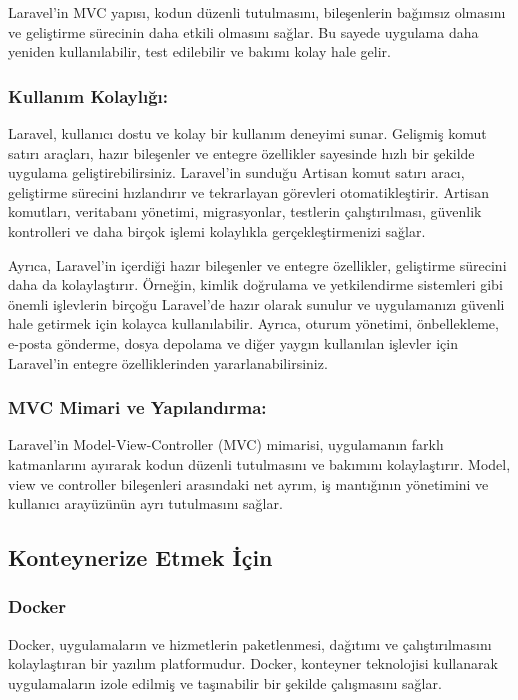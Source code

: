 Laravel'in MVC yapısı, kodun düzenli tutulmasını, bileşenlerin bağımsız olmasını ve geliştirme sürecinin daha etkili olmasını sağlar. Bu sayede uygulama daha yeniden kullanılabilir, test edilebilir ve bakımı kolay hale gelir.
\subsubsection{Kullanım Kolaylığı:}

Laravel, kullanıcı dostu ve kolay bir kullanım deneyimi sunar. Gelişmiş komut satırı araçları, hazır bileşenler ve entegre özellikler sayesinde hızlı bir şekilde uygulama geliştirebilirsiniz. Laravel'in sunduğu Artisan komut satırı aracı, geliştirme sürecini hızlandırır ve tekrarlayan görevleri otomatikleştirir. Artisan komutları, veritabanı yönetimi, migrasyonlar, testlerin çalıştırılması, güvenlik kontrolleri ve daha birçok işlemi kolaylıkla gerçekleştirmenizi sağlar.

Ayrıca, Laravel'in içerdiği hazır bileşenler ve entegre özellikler, geliştirme sürecini daha da kolaylaştırır. Örneğin, kimlik doğrulama ve yetkilendirme sistemleri gibi önemli işlevlerin birçoğu Laravel'de hazır olarak sunulur ve uygulamanızı güvenli hale getirmek için kolayca kullanılabilir. Ayrıca, oturum yönetimi, önbellekleme, e-posta gönderme, dosya depolama ve diğer yaygın kullanılan işlevler için Laravel'in entegre özelliklerinden yararlanabilirsiniz.
\subsubsection{MVC Mimari ve Yapılandırma: }
Laravel'in Model-View-Controller (MVC) mimarisi, uygulamanın farklı katmanlarını ayırarak kodun düzenli tutulmasını ve bakımını kolaylaştırır. Model, view ve controller bileşenleri arasındaki net ayrım, iş mantığının yönetimini ve kullanıcı arayüzünün ayrı tutulmasını sağlar.
\subsection{Konteynerize Etmek İçin  }
\subsubsection{Docker}
Docker, uygulamaların ve hizmetlerin paketlenmesi, dağıtımı ve çalıştırılmasını kolaylaştıran bir yazılım platformudur. Docker, konteyner teknolojisi kullanarak uygulamaların izole edilmiş ve taşınabilir bir şekilde çalışmasını sağlar.

